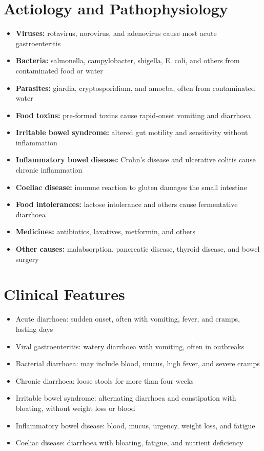 \section*{Aetiology and Pathophysiology}
\begin{itemize}
    \item \textbf{Viruses:} rotavirus, norovirus, and adenovirus cause most acute gastroenteritis
    \item \textbf{Bacteria:} salmonella, campylobacter, shigella, E. coli, and others from contaminated food or water
    \item \textbf{Parasites:} giardia, cryptosporidium, and amoeba, often from contaminated water
    \item \textbf{Food toxins:} pre-formed toxins cause rapid-onset vomiting and diarrhoea
    \item \textbf{Irritable bowel syndrome:} altered gut motility and sensitivity without inflammation
    \item \textbf{Inflammatory bowel disease:} Crohn's disease and ulcerative colitis cause chronic inflammation
    \item \textbf{Coeliac disease:} immune reaction to gluten damages the small intestine
    \item \textbf{Food intolerances:} lactose intolerance and others cause fermentative diarrhoea
    \item \textbf{Medicines:} antibiotics, laxatives, metformin, and others
    \item \textbf{Other causes:} malabsorption, pancreatic disease, thyroid disease, and bowel surgery
\end{itemize}

\section*{Clinical Features}
\begin{itemize}
    \item Acute diarrhoea: sudden onset, often with vomiting, fever, and cramps, lasting days
    \item Viral gastroenteritis: watery diarrhoea with vomiting, often in outbreaks
    \item Bacterial diarrhoea: may include blood, mucus, high fever, and severe cramps
    \item Chronic diarrhoea: loose stools for more than four weeks
    \item Irritable bowel syndrome: alternating diarrhoea and constipation with bloating, without weight loss or blood
    \item Inflammatory bowel disease: blood, mucus, urgency, weight loss, and fatigue
    \item Coeliac disease: diarrhoea with bloating, fatigue, and nutrient deficiency
\end{itemize}

